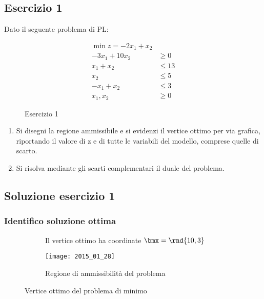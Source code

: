 \documentclass[\main/main.tex]{subfiles}
\begin{document}
\subsection{Esercizio 1}
Dato il seguente problema di PL:

\begin{figure}
  \begin{align*}
    \min z = -2x_1 + x_2    \\
    -3x_1 + 10x_2 & \geq 0  \\
    x_1 + x_2     & \leq 13 \\
    x_2           & \leq 5  \\
    -x_1 + x_2    & \leq 3  \\
    x_1, x_2      & \geq 0
  \end{align*}
  \caption{Esercizio 1}
\end{figure}

\begin{enumerate}
  \item Si disegni la regione ammissibile e si evidenzi il vertice ottimo per via grafica, riportando il valore di z e di tutte le variabili del modello, comprese quelle di scarto.
  \item Si risolva mediante gli scarti complementari il duale del problema.
\end{enumerate}

\subsection{Soluzione esercizio 1}

\subsubsection*{Identifico soluzione ottima}

\begin{figure}
  \begin{subfigure}{0.49\textwidth}
    \caption{Il vertice ottimo ha coordinate $\bmx = \rnd{10,3}$}
  \end{subfigure}
  \begin{subfigure}{0.49\textwidth}
    \texttt{[image: 2015\_01\_28]}
    \caption{Regione di ammissibilità del problema}
  \end{subfigure}
  \caption{Vertice ottimo del problema di minimo}
\end{figure}
\end{document}
